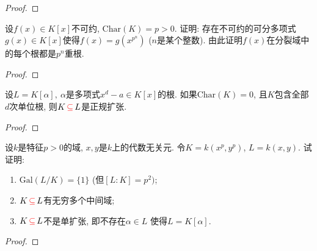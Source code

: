 \begin{proof}
    
\end{proof}

\begin{problem}
    设$f(x) \in K[x]$不可约, $\mathrm{Char}(K) = p > 0$.
证明: 存在不可约的可分多项式$g(x) \in K[x]$使得$f(x) = g(x^{p^n})$
($n$是某个整数). 由此证明$f(x)$在分裂域中的每个根都是$p^n$重根.
\end{problem}

\begin{proof}
    
\end{proof}

\begin{problem}
    设$L = K[\alpha],~\alpha$是多项式$x^d - a \in K[x]$的根.
如果$\mathrm{Char}(K) = 0$,
且$K$包含全部$d$次单位根, 则$K \,\textcolor{red}{\subseteq}\, L$是正规扩张.
\end{problem}

\begin{proof}
    
\end{proof}

\begin{problem}\label{ex:3.3.14}
    设$k$是特征$p > 0$的域, $x, y$是$k$上的代数无关元.
令$K = k(x^p, y^p)$, $L = k(x, y)$. 试证明: 
\begin{enumerate}[(1)]
    \item $\mathrm{Gal}(L/K) = \{1\}$ (但$[L:K] = p^2)$;
    \item $K \,\textcolor{red}{\subseteq}\, L$有无穷多个中间域;
    \item $K \,\textcolor{red}{\subseteq}\, L$不是单扩张, 即不存在$\alpha \in L$
使得$L = K[\alpha]$.
\end{enumerate}
\end{problem}

\begin{proof}
    
\end{proof}